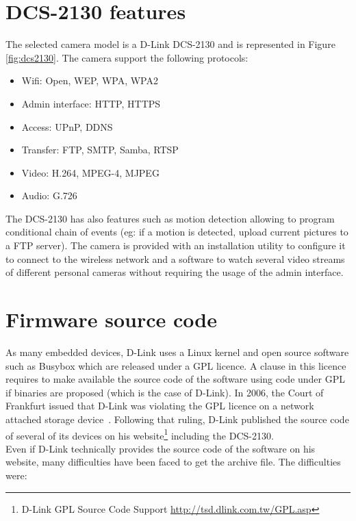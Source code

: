 \section{DCS-2130 features}
\label{sec:dcs-pres}

The selected camera model is a D-Link DCS-2130 and is represented in Figure \ref{fig:dcs2130}. The camera support the following protocols:\\

\begin{itemize}
\item Wifi: Open, WEP, WPA, WPA2
\item Admin interface: HTTP, HTTPS
\item Access: UPnP, DDNS
\item Transfer: FTP, SMTP, Samba, RTSP
\item Video: H.264, MPEG-4, MJPEG
\item Audio: G.726
\end{itemize}

The DCS-2130 has also features such as motion detection allowing to program conditional chain of events (eg: if a motion is detected, upload current pictures to a FTP server).
The camera is provided with an installation utility to configure it to connect to the wireless network and a software to watch several video streams of different personal cameras without requiring the usage of the admin interface.

\section{Firmware source code}
\label{sec:dcs-gpl}

As many embedded devices, D-Link uses a Linux kernel and open source software such as Busybox which are released under a GPL licence.
A clause in this licence requires to make available the source code of the software using code under GPL if binaries are proposed (which is the case of D-Link).
In 2006, the Court of Frankfurt issued that D-Link was violating the GPL licence on a network attached storage device~\cite{dlink-gpl-viol}.
Following that ruling, D-Link published the source code of several of its devices on his website\footnote{D-Link GPL Source Code Support \url{http://tsd.dlink.com.tw/GPL.asp}} including the DCS-2130.\\

Even if D-Link technically provides the source code of the software on his website, many difficulties have been faced to get the archive file.
The difficulties were:


